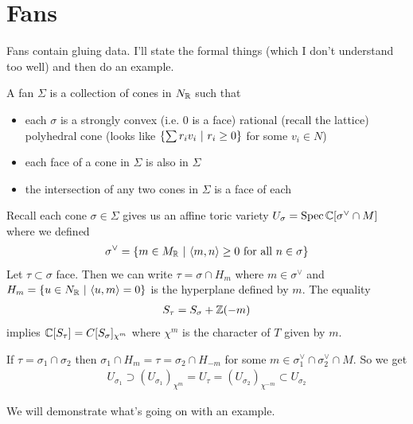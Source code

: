 \documentclass[12pt]{article}
\begin{document}
\section{Fans}
Fans contain gluing data. I'll state the formal things (which I don't understand too well) and then do an example.

\begin{definition}
	A fan $\Sigma$ is a collection of cones in $N_{\mathbb{R}}$ such that \begin{itemize}
		\item each $\sigma$ is a strongly convex (i.e. $0$ is a face) rational (recall the lattice)
		      polyhedral cone (looks like $\{\sum r_iv_i \ \vert \  r_i\geq 0\}$ for some $v_i\in N$)
		\item each face of a cone in $\Sigma$ is also in $\Sigma$
		\item the intersection of any two cones in $\Sigma$ is a face of each

	\end{itemize}
\end{definition}

Recall each cone $\sigma\in \Sigma$ gives us an affine toric variety $U_\sigma = \operatorname{Spec} \mathbb{C}[\sigma^\vee\cap M]$ where we defined \begin{align*}
    \sigma^\vee = \{m\in M_{\mathbb{R}} \ \vert \  \langle m,n\rangle \geq 0 \text{ for all } n\in \sigma\}
\end{align*}
Let $\tau\subset \sigma$ face. Then we can write $\tau = \sigma \cap H_m$ where $m\in \sigma^\vee$
and $H_m = \{u\in N_{\mathbb{R}} \ \vert \  \langle u,m\rangle = 0\}$ is
the hyperplane defined by $m$. The equality \begin{align*}
    S_\tau = S_\sigma + \mathbb{Z}(-m)
\end{align*} implies $\mathbb{C}[S_\tau] = C[S_\sigma]_{\chi^m}$ where $\chi^m$ is the character of $T$ given by $m$.

\hfill

If $\tau = \sigma_1 \cap \sigma_2$ then $\sigma_1 \cap H_m = \tau = \sigma_2 \cap H_{-m}$ for some 
$m\in \sigma_1^\vee\cap \sigma_2^\vee \cap M$. So we get  \begin{align*}
    U_{\sigma_1} \supset (U_{\sigma_1})_{\chi^m} = U_\tau = (U_{\sigma_2})_{\chi^{-m}} \subset U_{\sigma_2}
\end{align*}

\hfill

We will demonstrate what's going on with an example.
\end{document}
